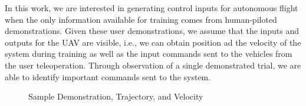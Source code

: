 \documentclass[letterpaper, 10 pt, conference]{ieeeconf}  %
\newcommand\NB[1]{$\spadesuit$\footnote{NB: #1}}
\begin{document}
In this work, we are interested in generating control inputs for autonomous flight when the only information available for training comes from human-piloted demonstrations. Given these user demonstrations, we assume that the inputs and outputs for the UAV are visible, i.e., we can obtain position ad the velocity of the system during training as well as the input commands sent to the vehicles from the user teleoperation. 
Through observation of a single demonstrated trial, we are able to identify important commands sent to the system. 



\begin{figure}[h]
	\centering
	\caption{Sample Demonstration, Trajectory, and Velocity}
	\label{fig:samps}
\end{figure}
\end{document}
